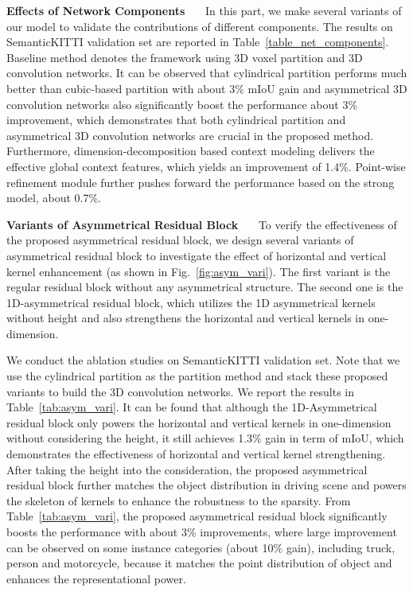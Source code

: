 \documentclass[final]{cvpr}
\begin{document}
\vspace{1ex}
\noindent\textbf{Effects of Network Components}~~~
In this part, we make several variants of our model to validate the contributions of different components. The results on SemanticKITTI validation set are reported in Table~\ref{table_net_components}. Baseline method denotes the framework using 3D voxel partition and 3D convolution networks. It can be observed that cylindrical partition performs much better than cubic-based partition with about 3\% mIoU gain and asymmetrical 3D convolution networks also significantly boost the performance about 3\% improvement, which demonstrates that both cylindrical partition and asymmetrical 3D convolution networks are crucial in the proposed method. Furthermore, dimension-decomposition based context modeling delivers the effective global context features, which yields an improvement of 1.4\%. Point-wise refinement module further pushes forward the performance based on the strong model, about 0.7\%.


\vspace{1ex}
\noindent\textbf{Variants of Asymmetrical Residual Block}~~~
To verify the effectiveness of the proposed asymmetrical residual block, we design several variants of asymmetrical residual block to investigate the effect of horizontal and vertical kernel enhancement (as shown in Fig.~\ref{fig:asym_vari}). The first variant is the regular residual block without any asymmetrical structure. The second one is the 1D-asymmetrical residual block, which utilizes the 1D asymmetrical kernels without height and also strengthens the horizontal and vertical kernels in one-dimension.

We conduct the ablation studies on SemanticKITTI validation set. Note that we use the cylindrical partition as the partition method and stack these proposed variants to build the 3D convolution networks. We report the results in Table~\ref{tab:asym_vari}. It can be found that although the 1D-Asymmetrical residual block only powers the horizontal and vertical kernels in one-dimension without considering the height, it still achieves 1.3\% gain in term of mIoU, which demonstrates the effectiveness of horizontal and vertical kernel strengthening. After taking the height into the consideration, the proposed asymmetrical residual block further matches the object distribution in driving scene and powers the skeleton of kernels to enhance the robustness to the sparsity. From Table~\ref{tab:asym_vari}, the proposed asymmetrical residual block significantly boosts the performance with about 3\% improvements, where large improvement can be observed on some instance categories (about 10\% gain), including truck, person and motorcycle, because it matches the point distribution of object and enhances the representational power.
\end{document}
